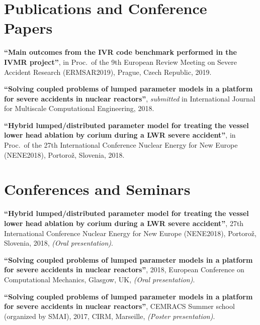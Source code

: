 \documentclass{article}
\renewenvironment{itemize}{
  \begin{list}{}{
      \setlength{\leftmargin}{1.5em}
      \setlength{\itemsep}{0.25em}
      \setlength{\parskip}{0pt}
      \setlength{\parsep}{0.25em}
    }
}{
  \end{list}
}
\begin{document}
\section*{Publications and Conference Papers}
\begin{itemize}
	\item \textbf{``Main outcomes from the IVR code benchmark performed in the IVMR project''}, in Proc.~of the 9th European Review Meeting on Severe Accident Research (ERMSAR2019),
Prague, Czech Republic, 2019.
	\item \textbf{``Solving coupled problems of lumped parameter models in a platform for severe accidents in nuclear reactors''}, \textit{submitted} in International Journal for Multiscale Computational Engineering, 2018.
	\item \textbf{``Hybrid lumped/distributed parameter model for treating the vessel lower head ablation by corium during a LWR severe accident''}, in Proc.~of the 27th International Conference Nuclear Energy for New Europe (NENE2018), Portorož, Slovenia, 2018.
\end{itemize}  

\section*{Conferences and Seminars}
\begin{itemize}
	\item \textbf{``Hybrid lumped/distributed parameter model for treating the vessel lower head ablation by corium during a LWR severe accident''}, 27th International Conference Nuclear Energy for New Europe (NENE2018), Portorož, Slovenia, 2018, \textit{(Oral presentation)}.
	\item \textbf{``Solving coupled problems of lumped parameter models in a platform for severe accidents in nuclear reactors''}, 2018, European Conference on Computational Mechanics, Glasgow, UK, \textit{(Oral presentation)}.
	\item \textbf{``Solving coupled problems of lumped parameter models in a platform for severe accidents in nuclear reactors''}, CEMRACS Summer school (organized by SMAI), 2017, CIRM, Marseille, \textit{(Poster presentation)}.
\end{itemize}  
\end{document}
